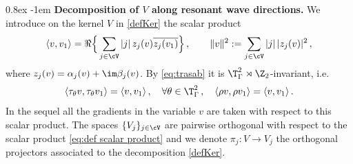 \documentclass[11pt,a4paper,reqno]{article}
\makeatletter
\renewcommand{\paragraph}{%
  \@startsection{paragraph}{4}{\z@}%
  {0.8ex}  %
  {-1em}   %
  {\normalfont\bfseries}%
}
\numberwithin{equation}{section}
\theoremstyle{definition}
\makeatother
\begin{document}
\paragraph{\bf Decomposition of $ V $ along resonant wave directions.}
We  introduce on the kernel $V$ in \eqref{defKer} the  scalar product  
\begin{equation}\label{eq:def scalar product}
    \langle v, v_1 \rangle =\Re\Big\{\sum_{j\in\cV} |j| \, z_j(v)\overline{z_j(v_1)}\Big\} \, , \qquad \|v \|^2 := \sum_{j\in\cV} |j| \, |z_j(v)|^2 \, , 
\end{equation}
where $z_j(v) =\alpha_j(v)+\im \beta_j(v)$. By  \eqref{eq:trasab}
it is $ \T^2_\Gamma\rtimes \Z_2 $-invariant, i.e. 
$$ 
\langle \tau_\theta v, \tau_\theta v_1\rangle=\langle v,v_1\rangle \, , \quad 
\forall 
\theta\in \T^2_\Gamma \, ,  \quad \langle \rho v, \rho v_1\rangle=\langle v, v_1\rangle \, . 
$$
In the sequel all the gradients in the variable $v$ are taken with respect to this scalar product.
The spaces $\{V_j\}_{j\in\cV}$ are pairwise orthogonal with 
respect to the scalar product \eqref{eq:def scalar product} and we denote $ \pi_{j}:V\to V_j $ the  orthogonal projectors associated to the decomposition \eqref{defKer}.
\end{document}
